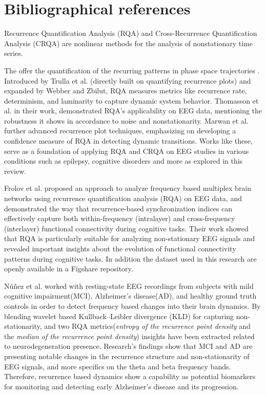 \documentclass{article}
\begin{document}
	\section*{Bibliographical references}
			Recurrence Quantification Analysis (RQA) and Cross-Recurrence Quantification Analysis (CRQA) are
			nonlinear methods for the analysis of nonstationary time series. 

			The offer the quantification of the recurring patterns in phase space trajectories \cite{trulla1996, webber2005}. 
			Introduced by Trulla et al.\cite{trulla1996} (directly built on quantifying recurrence plots\cite{eckmann1987}) 
			and expanded by Webber and Zbilut\cite{webber2005}, RQA measures metrics 
			like recurrence rate, determinism, and laminarity to capture dynamic system behavior. 
			Thomasson et al.\cite{thomasson2002} in their work, demonstrated RQA’s applicability on EEG data, mentioning 
			the robustness it shows in accordance to noise
			and nonstationarity. Marwan et al.\cite{marwan2013} further advanced recurrence plot techniques,
			emphasizing on developing a confidence measure of RQA in detecting dynamic transitions.
			Works like these, serve as a foundation of applying RQA and CRQA on EEG 
			studies in various conditions such as epilepsy, cognitive disorders and more 
			as explored in this review.

			Frolov et al.\cite{frolov} proposed an approach to analyze frequency based multiplex brain networks
			using recurrence quantification analysis (RQA) 
			on EEG data, and demonstrated the way that recurrence-based 
			synchronization indices can effectively capture 
			both within-frequency (intralayer) and cross-frequency (interlayer) 
			functional connectivity during cognitive tasks. 
			Their work showed that RQA is particularly suitable for analyzing 
			non-stationary EEG signals and revealed
			important insights about the evolution of functional connectivity 
			patterns during cognitive tasks. In addition the dataset
			used in this research are openly available in a Figshare repository.

			Núñez et al. \cite{nunez2020characterization} worked with 
			resting-state EEG recordings from subjects with mild cognitive impairment(MCI), 
			Alzheimer's disease(AD), and healthy ground truth controls in order to detect 
			frequency based changes into their brain dynamics. 
			By blending wavelet based Kullback–Leibler divergence
			(KLD) for capturing non-stationarity,
			and two RQA
			metrics(\textit{entropy of the recurrence point density}
			and the \textit{median of the recurrence point density}) insights have been
			extracted related to neurodegeneration presence.
			Research's findings show that MCI and AD are presenting notable changes in 
			the recurrence structure and non-stationarity of EEG signals,
			and more specifics on the theta and beta frequency bands.
			Therefore, recurrence based dynamics show a capability as potential 
			biomarkers for monitoring and detecting early Alzheimer's disease and its progression.
\end{document}
